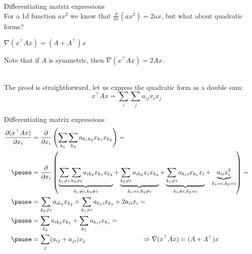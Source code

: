 \documentclass[UKenglish,aspectratio=169]{beamer}
\begin{document}
\begin{frame}{Differentiating matrix expressions}
~\\
For a 1d function $ax^2$ we know that $\frac{d}{dx}(ax^2) = 2ax$, but what about quadratic forms?
\begin{theorem}
$\nabla (x^\top A x) = (A+A^\top)x$
\end{theorem}
Note that if $A$ is symmetric, then $\nabla (x^\top A x) = 2Ax$.

~\\

The proof is straightforward, let us express the quadratic form as a double sum:
$$x^\top A x = \sum\limits_i\sum\limits_j a_{ij} x_i x_j$$
\end{frame}

\begin{frame}{Differentiating matrix expressions}
\vspace{-10pt}
\[
  \begin{aligned}
\frac{\partial (x^\top A x)}{\partial x_i}
&= \frac{\partial}{\partial x_i}  \left(\sum\limits_{k_1}\sum\limits_{k_2} a_{k_1 k_2} x_{k_1} x_{k_2}\right) = \\ \pause
&= \frac{\partial}{\partial x_i}  \left( 
\underbrace{\sum\limits_{k_1\neq i}\sum\limits_{k_2\neq i} a_{ik_2}x_{k_1} x_{k_2}}_{k_1 \neq i, k_2 \neq i}+\underbrace{\sum\limits_{k_2\neq i} a_{ik_2}x_i x_{k_2}}_{k_1 = i, k_2\neq i}+
\underbrace{\sum\limits_{k_1\neq i} a_{k_1 i} x_{k_1} x_i}_{k_1 \neq i, k_2 = i}+
\underbrace{a_{ii}x_i^2}_{k_1 = i, k_2 = i}\right) = \\ \pause
& = \sum\limits_{k_2\neq i} a_{ik_2}x_{k_2} + \sum\limits_{k_1\neq i} a_{k_1 i} x_{k_1} + 2 a_{ii} x_i = \\ \pause
& = \sum\limits_{k_2} a_{ik_2}x_{k_2} + \sum\limits_{k_1} a_{k_1 i} x_{k_1} = \\ \pause
& = \sum\limits_{j} (a_{ij} + a_{ji}) x_j \hspace{3cm} \Rightarrow \nabla(x^\top A x)  = (A+A^\top)x
\end{aligned}
\]
\end{frame}
\end{document}
